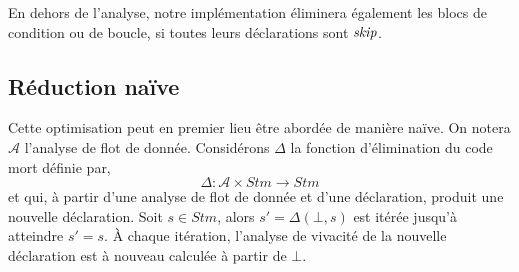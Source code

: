 \documentclass[a4paper, 10pt]{article}
\begin{document}
En dehors de l'analyse, notre implémentation éliminera également les blocs de condition ou de boucle, si toutes leurs déclarations sont $\textit{skip}$.

\subsection{Réduction naïve}
Cette optimisation peut en premier lieu être abordée de manière naïve. On notera $\mathcal{A}$ l'analyse de flot de donnée.
Considérons $\Delta$ la fonction d'élimination du code mort définie par,
\[\Delta : \mathcal{A} \times Stm \longrightarrow Stm\]
et qui, à partir d'une analyse de flot de donnée et d'une déclaration, produit une nouvelle déclaration. Soit $s \in Stm$, alors
$s' = \Delta(\bot, s)$ est itérée jusqu'à atteindre $s' = s$. À chaque itération,
l'analyse de vivacité de la nouvelle déclaration est à nouveau calculée à partir de $\bot$.
 \\
 \\
\end{document}
